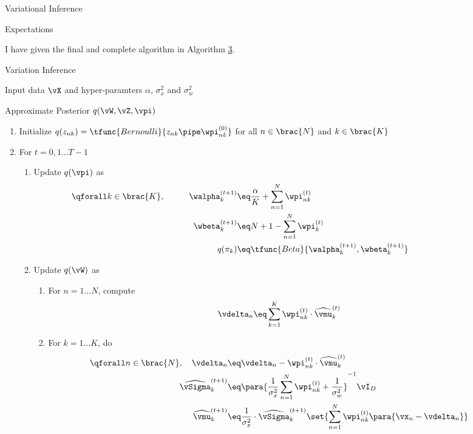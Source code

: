 \documentclass{article}
\begin{document}
\begin{question}
\begin{qsection}{Variational Inference}
\begin{qsubsection}{Expectations}
		\end{qsubsection}

		I have given the final and complete algorithm in Algorithm \hyperlink{algo:3}{3}.

		\begin{algo}[0.9\textwidth]{Variation Inference}

			 Input data $\vX$ and hyper-paramters $\alpha$, $\sigma_x^2$ and $\sigma_w^2$ \sbr

			 Approximate Posterior $q(\vW, \vZ, \vpi)$ \sbr

			\begin{enumerate}
				\item Initialize $q(z_{nk}) = \tfunc{Bernoulli}{z_{nk} \pipe \wpi_{nk}^{(0)}}$ for all $n \in \brac{N}$ and $k \in \brac{K}$
				\item For $t = 0, 1 \dots T - 1$
					\begin{enumerate}
						\item Update $q(\vpi)$ as
							\begin{align*}
								\qforall k \in \brac{K}, \hspace{1cm} \walpha_k^{(t + 1)}	&\eq	\frac{\alpha}{K} + \sum_{n = 1}^N \wpi_{nk}^{(t)} & \hspace{3cm} & \\
								\wbeta_k^{(t + 1)}	&\eq	N + 1 - \sum_{n = 1}^N \wpi_k^{(t)} \\
								q(\pi_k)	&\eq	\tfunc{Beta}{\walpha_k^{(t + 1)}, \wbeta_k^{(t + 1)}}
							\end{align*}
						\item Update $q(\vW)$ as
							\begin{enumerate}
								\item For $n = 1 \dots N$, compute
									\begin{align*}
										\vdelta_n	&\eq	\sum_{k = 1}^K \wpi_{nk}^{(t)} \cdot \widehat{\vmu}_k^{(t)} &&
									\end{align*}
								\item For $k = 1 \dots K$, do
									\begin{align*}
										\qforall n \in \brac{N}, \quad \vdelta_n	&\eq	\vdelta_n - \wpi_{nk}^{(t)} \cdot \widehat{\vmu}_{k}^{(t)} \\
										\widehat{\vSigma}_k^{(t + 1)}	&\eq	\para{\frac{1}{\sigma_x^2} \sum_{n = 1}^N \wpi_{nk}^{(t)} + \frac{1}{\sigma_w^2}}^{-1} \vI_D \\
										\widehat{\vmu}_k^{(t + 1)}	&\eq	\frac{1}{\sigma_x^2} \cdot \widehat{\vSigma}_k^{(t + 1)} \set{\sum_{n = 1}^N \wpi_{nk}^{(t)} \para{\vx_n - \vdelta_n}} && \\

\end{align*}
\end{enumerate}
\end{enumerate}
\end{enumerate}
\end{algo}
\end{qsection}
\end{question}
\end{document}
